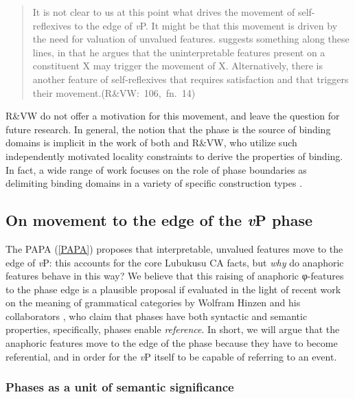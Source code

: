 \documentclass[output=paper
,modfonts
,nonflat
]{langsci/langscibook}
\begin{document}
\begin{quote}
It is not clear to us at this point what drives the movement of self-reflexives to the edge of \textit{v}P. It might be that this movement is driven by the need for valuation of unvalued features. \citet{Boskovic:2007a} suggests something along these lines, in that he argues that the uninterpretable features present on a constituent X may trigger the movement of X. Alternatively, there is another feature of self-reflexives that requires satisfaction and that triggers their movement.\hbox{}\hfill\hbox{(R\&VW: 106, fn. 14)}
\end{quote}
\noindent R\&VW do not offer a motivation for this movement, and leave the question for future research. In general, the notion that the phase is the source of binding domains is implicit in the work of both \citet{Reuland:2011} and R\&VW, who utilize such independently motivated locality constraints to derive the properties of binding. In fact, a wide range of work focuses on the role of phase boundaries as delimiting binding domains in a variety of specific construction types \citep{Wurmbrand:2011,Lee-Schoenfeld:2008,Canac-Marquis:2005,Heinat:2006,Hicks:2009,Quicoli:2008,CharnavelSportiche:2016}.

\subsection{On movement to the edge of the \textit{v}P phase}

The PAPA (\ref{PAPA}) proposes that interpretable, unvalued features move to the edge of \textit{v}P: this accounts for the core Lubukusu CA facts, but \textit{why} do anaphoric features behave in this way? We believe that this raising of anaphoric φ-features to the phase edge is a plausible proposal if evaluated in the light of recent work on the meaning of grammatical categories by Wolfram Hinzen and his collaborators \citep{Hinzen:2012,SheehanHinzen:2011,HinzenSheehan:2013,ArsenijevicHinzen:2012}, who claim that phases have both syntactic and semantic properties, specifically, phases enable \textit{reference}. In short, we will argue that the anaphoric features move to the edge of the phase because they have to become referential, and in order for the \textit{v}P itself to be capable of referring to an event. 

\subsubsection{Phases as a unit of semantic significance}
\end{document}
